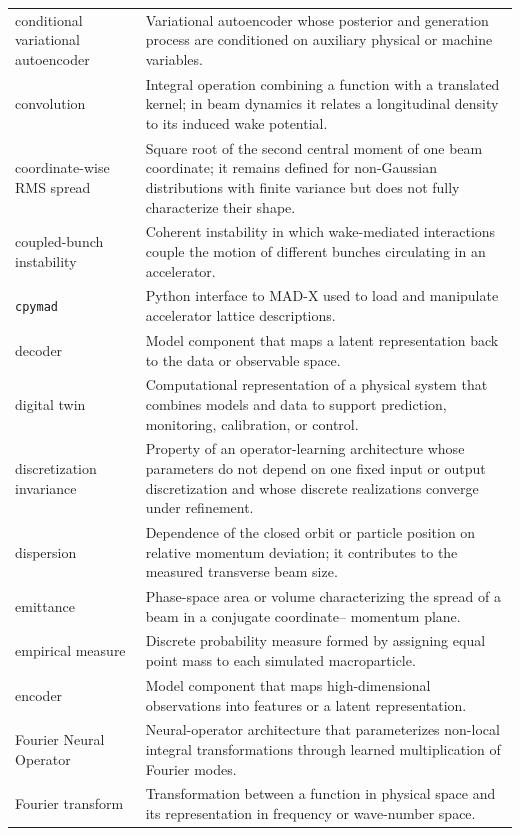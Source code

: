 \begin{longtable}{@{}p{}@{}p{}@{}}
conditional variational autoencoder & Variational autoencoder whose posterior and generation process are conditioned on auxiliary physical or machine variables.\\
convolution & Integral operation combining a function with a translated kernel; in beam dynamics it relates a longitudinal density to its induced wake potential.\\
coordinate-wise RMS spread & Square root of the second central moment of one beam coordinate; it remains defined for non-Gaussian distributions with finite variance but does not fully characterize their shape.\\
coupled-bunch instability & Coherent instability in which wake-mediated interactions couple the motion of different bunches circulating in an accelerator.\\
\noalign{\vskip\baselineskip}
\texttt{cpymad} & Python interface to MAD-X used to load and manipulate accelerator lattice descriptions.\\
\noalign{\vskip\baselineskip}
decoder & Model component that maps a latent representation back to the data or observable space.\\
digital twin & Computational representation of a physical system that combines models and data to support prediction, monitoring, calibration, or control.\\
discretization invariance & Property of an operator-learning architecture whose parameters do not depend on one fixed input or output discretization and whose discrete realizations converge under refinement.\\
dispersion & Dependence of the closed orbit or particle position on relative momentum deviation; it contributes to the measured transverse beam size.\\
\noalign{\vskip\baselineskip}
emittance & Phase-space area or volume characterizing the spread of a beam in a conjugate coordinate– momentum plane.\\
empirical measure & Discrete probability measure formed by assigning equal point mass to each simulated macroparticle.\\
encoder & Model component that maps high-dimensional observations into features or a latent representation.\\
\noalign{\vskip\baselineskip}
Fourier Neural Operator & Neural-operator architecture that parameterizes non-local integral transformations through learned multiplication of Fourier modes.\\
Fourier transform & Transformation between a function in physical space and its representation in frequency or wave-number space.\\

\end{longtable}
